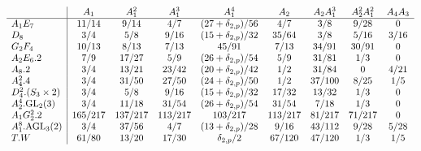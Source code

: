 \documentclass[twoside,a4paper,reqno,11pt]{amsart}
\renewcommand{\a}{\alpha}
\renewcommand{\b}{\beta}
\newcommand{\<}{\langle}
\renewcommand{\>}{\rangle}
\newcommand{\leqs}{\leqslant}
\renewcommand{\:}{\colon}
\theoremstyle{plain}
\theoremstyle{definition}
\begin{document}
{\small
\begin{table}
\[
\begin{array}{l|cccccccc}
& A_1 & A_1^2 & A_1^3 & A_1^4 & A_2 & A_2A_1^3 & A_2^2A_1^2 & A_4A_3 \\ \hline
A_1E_7 & 11/14 & 9/14 & 4/7 & (27+\delta_{2,p})/56 & 4/7 & 3/8 & 9/28 & 0 \\
D_8 & 3/4 & 5/8 & 9/16 & (15+\delta_{2,p})/32 & 35/64 & 3/8 & 5/16 & 3/16 \\
G_2F_4 & 10/13 & 8/13 & 7/13 & 45/91 & 7/13 & 34/91 & 30/91 & 0 \\
A_2E_6.2 & 7/9 & 17/27 & 5/9 & (26+\delta_{2,p})/54 & 5/9 & 31/81 & 1/3 & 0 \\
A_8.2 & 3/4 & 13/21 & 23/42 & (20+\delta_{2,p})/42 & 1/2 & 31/84 & 0 & 4/21 \\
A_4^2.4 & 3/4 & 31/50 & 27/50 & (24+\delta_{2,p})/50 & 1/2 & 37/100 & 8/25 & 1/5 \\
D_4^2.(S_3 \times 2) & 3/4 & 5/8 & 9/16 & (15+\delta_{2,p})/32 & 17/32 & 13/32 & 1/3 & 0 \\
A_2^4.{\rm GL}_2(3) & 3/4 & 11/18 & 31/54 & (26+\delta_{2,p})/54 & 31/54 & 7/18 & 1/3 & 0 \\
A_1G_2^2.2 & 165/217 & 137/217 & 113/217 & 103/217 & 113/217 & 81/217 & 71/217 & 0  \\ 
A_1^8.{\rm AGL}_3(2) & 3/4 & 37/56 & 4/7 & (13+\delta_{2,p})/28 & 9/16 & 43/112 & 9/28 & 5/28 \\
T.W & 61/80 & 13/20 & 17/30 & \delta_{2,p}/2 & 67/120 & 47/120 & 1/3 & 1/5 \\
\end{array}
\]
\caption{The upper bound $\a(G,H,y) \leqs \b$ in Proposition \ref{p:e8_dim3}}
\label{tab:beta_e8}
\end{table}}
\end{document}
